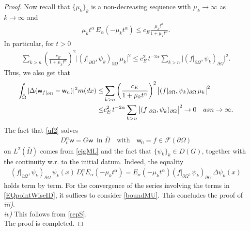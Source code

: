 \documentclass[11pt,a4paper]{article}
\begin{document}
\begin{proof}
Now recall that $\{\mu_k\}_k$ is a non-decreasing sequence with $\mu_k \to \infty$ as $k \to \infty$ and 
\begin{align}
\mu_k t^\alpha\, E_\alpha (-\mu_k t^\alpha) \leq c_E \frac{\mu_k t^\alpha}{1 + \mu_k t^\alpha}.
\label{boundMLfunction}
\end{align}
In particular, for $t>0$
\begin{align*}
\sum_{k > n} \left(\frac{c_E}{1+ \mu_k t^\alpha}\right)^2 \big| (f|_{\partial \Omega}, \psi_k)_{\partial \Omega}\, \mu_k \big|^2 \leq c_E^2\, t^{-2\alpha}\sum_{k > n} \big| (f|_{\partial \Omega}, \psi_k)_{\partial \Omega}\big|^2.
\end{align*}
Thus, we also get that
\begin{align}
\int_{\bar{\Omega}}| \Delta (\mathsf{w}_{f|_{\partial \Omega}} - \mathsf{w}_{n}) |^2 m(dx) 
\leq & \sum_{k > n} \left(\frac{c_E}{1+ \mu_k t^\alpha}\right)^2 \big| (f|_{\partial \Omega}, \psi_k)_{\partial \Omega}\, \mu_k \big|^2 \notag\\
\leq & c^2_E\, t^{-2\alpha} \sum_{k > n}  \big| (f|_{\partial \Omega}, \psi_k)_{\partial \Omega} \big|^2 \to 0 \quad \textrm{as } n \to \infty. \label{boundMU}
\end{align}  
The fact that \eqref{uf2} solves 
\begin{align*}
D^\alpha_t \mathsf{w} = G \mathsf{w} \;\; \textrm{in } \bar{\Omega} \quad \textrm{with} \quad \mathsf{w}_0 = f \in \mathcal{F}(\partial \Omega)
\end{align*}
on $L^2(\bar{\Omega})$ comes from \eqref{eigML} and the fact that $\{\psi_k\}_k \in D(G)$, together with the continuity w.r. to the initial datum. Indeed, the equality
\begin{align}
 (f|_{\partial \Omega}, \psi_k)_{\partial \Omega}\, \psi_k(x) \, D^\alpha_t E_\alpha(-\mu_k t^\alpha)  = E_\alpha(-\mu_k t^\alpha) (f|_{\partial \Omega}, \psi_k)_{\partial \Omega}\, \Delta \psi_k(x)
 \label{EQpointWiseID}
\end{align}
holds term by term. For the convergence of the series involving the terms in \eqref{EQpointWiseID}, it suffices to consider \eqref{boundMU}. This concludes the proof of \textit{iii)}.\\
 

\textit{iv)} This follows from \eqref{repS}.\\

The proof is completed.
\end{proof}
\end{document}
